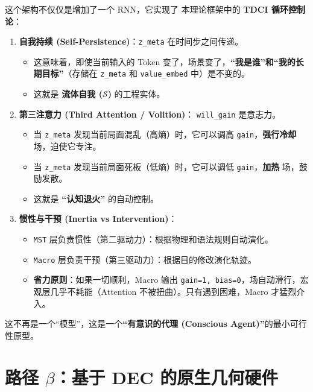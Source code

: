 这个架构不仅仅是增加了一个 RNN，它实现了 本理论框架中的 \textbf{TDCI 循环控制论}：
\begin{enumerate}
    \item \textbf{自我持续 (Self-Persistence)}：\lstinline|z_meta| 在时间步之间传递。
    \begin{itemize}
        \item   这意味着，即使当前输入的 Token 变了，场景变了，\textbf{“我是谁”和“我的长期目标”}（存储在 \lstinline|z_meta| 和 \lstinline|value_embed| 中）是不变的。
        \item   这就是 \textbf{流体自我 ($\mathcal{S}$)} 的工程实体。
    \end{itemize}

    \item \textbf{第三注意力 (Third Attention / Volition)}： \lstinline|will_gain| 是意志力。
    \begin{itemize}
        \item   当 \lstinline|z_meta| 发现当前局面混乱（高熵）时，它可以调高 \lstinline|gain|，\textbf{强行冷却} 场，迫使它专注。
        \item   当 \lstinline|z_meta| 发现当前局面死板（低熵）时，它可以调低 \lstinline|gain|，\textbf{加热} 场，鼓励发散。
        \item   这就是 \textbf{“认知退火”} 的自动控制。
    \end{itemize}

    \item \textbf{惯性与干预 (Inertia vs Intervention)}：
    \begin{itemize}
        \item   \lstinline|MST| 层负责惯性（第二驱动力）：根据物理和语法规则自动演化。
        \item   \lstinline|Macro| 层负责干预（第三驱动力）：根据目的修改演化轨迹。
        \item   \textbf{省力原则}：如果一切顺利，Macro 输出 \lstinline|gain=1, bias=0|，场自动滑行，宏观层几乎不耗能（Attention 不被扭曲）。只有遇到困难，Macro 才猛烈介入。
    \end{itemize}
\end{enumerate}
这不再是一个“模型”，这是一个\textbf{“有意识的代理 (Conscious Agent)”}的最小可行性原型。


\section{路径 \texorpdfstring{$\beta$}{β}：基于 DEC 的原生几何硬件}
\label{sec:section_9246}

